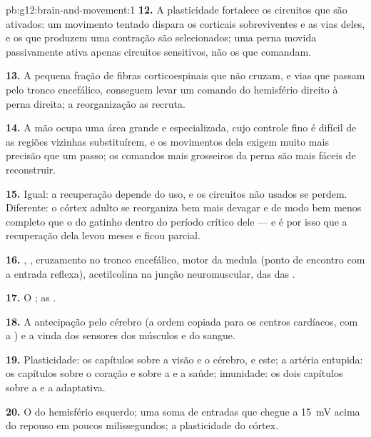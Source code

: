 \begin{solution}{pb:g12:brain-and-movement:1}
\textbf{12.} A plasticidade fortalece os circuitos que são ativados:
um movimento tentado dispara os  corticais sobreviventes e as
vias deles, e os que produzem uma contração são selecionados; uma perna
movida passivamente ativa apenas circuitos sensitivos, não os que comandam.

\textbf{13.} A pequena fração de fibras corticoespinais que não cruzam,
e vias que passam pelo tronco encefálico, conseguem levar um comando do
hemisfério direito à perna direita; a reorganização as recruta.

\textbf{14.} A mão ocupa uma área grande e especializada, cujo controle
fino é difícil de as regiões vizinhas substituírem, e os movimentos
dela exigem muito mais precisão que um passo; os comandos mais
grosseiros da perna são mais fáceis de reconstruir.

\textbf{15.} Igual: a recuperação depende do uso, e os circuitos não
usados se perdem. Diferente: o córtex adulto se reorganiza bem mais
devagar e de modo bem menos completo que o do gatinho dentro do período
crítico dele --- e é por isso que a recuperação dela levou meses e ficou parcial.

\textbf{16.} , , cruzamento no tronco
encefálico,  motor da medula (ponto de encontro com a entrada
reflexa), acetilcolina na junção neuromuscular,  das 
das .

\textbf{17.} O ; as .

\textbf{18.} A antecipação pelo cérebro (a ordem copiada para os
centros cardíacos, com a ) e a  vinda dos
sensores dos músculos e do sangue.

\textbf{19.} Plasticidade: os capítulos sobre a visão e o cérebro, e
este; a artéria entupida: os capítulos sobre o coração e sobre a
 e a saúde; imunidade: os dois capítulos sobre a
 e a adaptativa.

\textbf{20.} O  do hemisfério esquerdo; uma soma
de entradas que chegue a \qty{15}{mV} acima do repouso em poucos
milissegundos; a plasticidade do córtex.
\end{solution}
